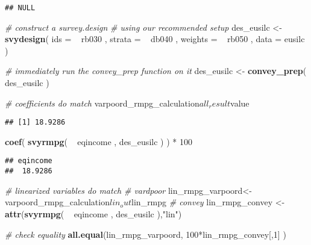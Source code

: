 \documentclass[]{book}
\newenvironment{Shaded}{\begin{snugshade}}{\end{snugshade}}
\newcommand{\KeywordTok}[1]{\textcolor[rgb]{0.13,0.29,0.53}{\textbf{{#1}}}}
\newcommand{\DataTypeTok}[1]{\textcolor[rgb]{0.13,0.29,0.53}{{#1}}}
\newcommand{\DecValTok}[1]{\textcolor[rgb]{0.00,0.00,0.81}{{#1}}}
\newcommand{\StringTok}[1]{\textcolor[rgb]{0.31,0.60,0.02}{{#1}}}
\newcommand{\CommentTok}[1]{\textcolor[rgb]{0.56,0.35,0.01}{\textit{{#1}}}}
\newcommand{\NormalTok}[1]{{#1}}
\begin{document}
\begin{verbatim}
## NULL
\end{verbatim}

\begin{Shaded}
\begin{Highlighting}[]
\CommentTok{# construct a survey.design}
\CommentTok{# using our recommended setup}
\NormalTok{des_eusilc <-}\StringTok{ }
\StringTok{    }\KeywordTok{svydesign}\NormalTok{( }
        \DataTypeTok{ids =} \NormalTok{~}\StringTok{ }\NormalTok{rb030 , }
        \DataTypeTok{strata =} \NormalTok{~}\StringTok{ }\NormalTok{db040 ,  }
        \DataTypeTok{weights =} \NormalTok{~}\StringTok{ }\NormalTok{rb050 , }
        \DataTypeTok{data =} \NormalTok{eusilc}
    \NormalTok{)}

\CommentTok{# immediately run the convey_prep function on it}
\NormalTok{des_eusilc <-}\StringTok{ }\KeywordTok{convey_prep}\NormalTok{( des_eusilc )}

\CommentTok{# coefficients do match}
\NormalTok{varpoord_rmpg_calculation$all_result$value}
\end{Highlighting}
\end{Shaded}

\begin{verbatim}
## [1] 18.9286
\end{verbatim}

\begin{Shaded}
\begin{Highlighting}[]
\KeywordTok{coef}\NormalTok{( }\KeywordTok{svyrmpg}\NormalTok{( ~}\StringTok{ }\NormalTok{eqincome , des_eusilc ) ) *}\StringTok{ }\DecValTok{100}
\end{Highlighting}
\end{Shaded}

\begin{verbatim}
## eqincome 
##  18.9286
\end{verbatim}

\begin{Shaded}
\begin{Highlighting}[]
\CommentTok{# linearized variables do match}
\CommentTok{# vardpoor}
\NormalTok{lin_rmpg_varpoord<-}\StringTok{ }\NormalTok{varpoord_rmpg_calculation$lin_out$lin_rmpg}
\CommentTok{# convey }
\NormalTok{lin_rmpg_convey <-}\StringTok{ }\KeywordTok{attr}\NormalTok{(}\KeywordTok{svyrmpg}\NormalTok{( ~}\StringTok{ }\NormalTok{eqincome , des_eusilc ),}\StringTok{"lin"}\NormalTok{)}

\CommentTok{# check equality}
\KeywordTok{all.equal}\NormalTok{(lin_rmpg_varpoord, }\DecValTok{100}\NormalTok{*lin_rmpg_convey[,}\DecValTok{1}\NormalTok{] )}
\end{Highlighting}
\end{Shaded}
\end{document}
